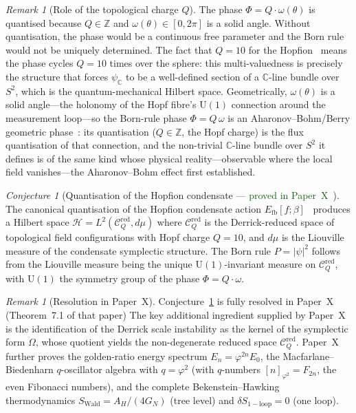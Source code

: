 \documentclass[11pt,a4paper]{article}
\theoremstyle{definition}
\theoremstyle{remark}
\newtheorem{remark}[theorem]{Remark}
\newtheorem{conjecture}[theorem]{Conjecture}
\newcommand{\vp}{\varphi}
\newcommand{\CC}{\mathbb{C}}
\newcommand{\ZZ}{\mathbb{Z}}
\begin{document}
\begin{remark}[Role of the topological charge $Q$]
\label{P9:rem:role_of_Q}
The phase $\Phi = Q\cdot\omega(\theta)$ is quantised because $Q\in\ZZ$
and $\omega(\theta)\in[0,2\pi]$ is a solid angle.
Without quantisation, the phase would be a continuous free parameter and
the Born rule would not be uniquely determined.
The fact that $Q=10$ for the Hopfion~\cite{Paper1} means
the phase cycles $Q=10$ times over the sphere: this multi-valuedness
is precisely the structure that forces $\psi_\CC$ to be a well-defined
section of a $\CC$-line bundle over $S^2$, which is the quantum-mechanical
Hilbert space.
Geometrically, $\omega(\theta)$ is a solid angle---the holonomy of the Hopf
fibre's $\mathrm{U}(1)$ connection around the measurement loop---so the
Born-rule phase $\Phi=Q\,\omega$ is an Aharonov--Bohm/Berry geometric
phase~\cite{AharonovBohm1959}:
its quantisation ($Q\in\ZZ$, the Hopf charge) is the flux quantisation of that
connection, and the non-trivial $\CC$-line bundle over $S^2$ it defines is of
the same kind whose physical reality---observable where the local field
vanishes---the Aharonov--Bohm effect first established.
\end{remark}

\begin{conjecture}[Quantisation of the Hopfion condensate --- \textcolor{darkgreen}{proved in Paper~X~\cite{Paper10}}]
\label{P9:conj:quantisation}
The canonical quantisation of the Hopfion condensate action
$E_\mathrm{fb}[f;\beta]$~\cite{Paper6,Paper7} produces a
Hilbert space $\mathcal{H}=L^2(\mathcal{C}_Q^\mathrm{red},d\mu)$ where
$\mathcal{C}_Q^\mathrm{red}$ is the Derrick-reduced space of topological
field configurations with Hopf charge $Q=10$, and $d\mu$ is the Liouville
measure of the condensate symplectic structure.
The Born rule $P=|\psi|^2$ follows from the Liouville measure being
the unique $\mathrm{U}(1)$-invariant measure on $\mathcal{C}_Q^\mathrm{red}$,
with $\mathrm{U}(1)$ the symmetry group of the phase $\Phi = Q\cdot\omega$.
\end{conjecture}
 
\begin{remark}[Resolution in Paper~X]
\label{P9:rem:conj_resolved}
Conjecture~\ref{P9:conj:quantisation} is fully resolved in
Paper~X~\cite{Paper10} (Theorem~7.1 of that paper)
The key additional ingredient supplied by Paper~X is the identification
of the Derrick scale instability as the kernel of the symplectic form
$\Omega$, whose quotient yields the non-degenerate reduced space
$\mathcal{C}_Q^\mathrm{red}$.
Paper~X further proves the golden-ratio energy spectrum
$E_n = \vp^{2n}E_0$, the Macfarlane--Biedenharn $q$-oscillator algebra
with $q=\vp^2$ (with $q$-numbers $[n]_{\vp^2}=F_{2n}$, the even Fibonacci
numbers), and the complete Bekenstein--Hawking thermodynamics
$S_\mathrm{Wald}=A_H/(4G_N)$ (tree level) and $\delta S_\mathrm{1-loop}=0$
(one loop).
\end{remark}
 
\end{document}
